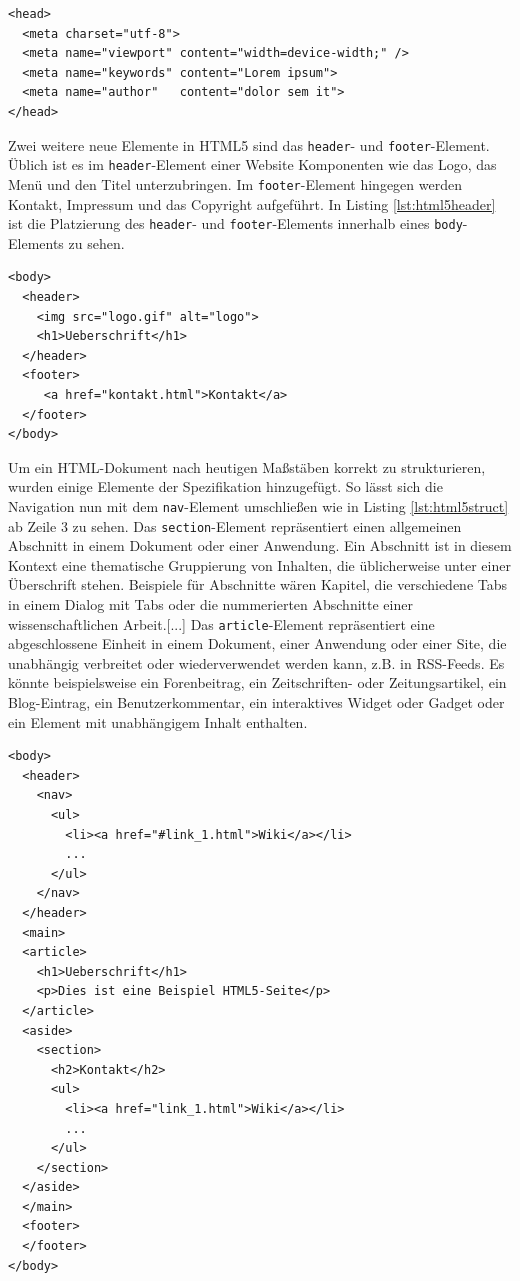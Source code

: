 \vspace{1em}
\begin{lstlisting}[language=HTML5, caption=HTML5 \texttt{meta}-Element, label=lst:html5meta]
<head>
  <meta charset="utf-8">
  <meta name="viewport" content="width=device-width;" />
  <meta name="keywords" content="Lorem ipsum">
  <meta name="author"   content="dolor sem it">
</head>
\end{lstlisting}
		
Zwei weitere neue Elemente in HTML5 sind das \texttt{header}- und \texttt{footer}-Element. Üblich ist es im \texttt{header}-Element einer Website Komponenten wie das Logo, das Menü und den Titel unterzubringen. Im \texttt{footer}-Element hingegen werden Kontakt, Impressum und das Copyright aufgeführt. In Listing \ref{lst:html5header} ist die Platzierung des \texttt{header}- und \texttt{footer}-Elements innerhalb eines \texttt{body}-Elements zu sehen.

\vspace{1em}
\begin{lstlisting}[language=HTML5, caption=HTML5 \texttt{header}- und \texttt{footer}-Element, label=lst:html5header]
<body>
  <header>
    <img src="logo.gif" alt="logo">
    <h1>Ueberschrift</h1>
  </header>
  <footer>
     <a href="kontakt.html">Kontakt</a>
  </footer>
</body>
\end{lstlisting}
	
Um ein HTML-Dokument nach heutigen Maßstäben korrekt zu strukturieren, wurden einige Elemente der Spezifikation hinzugefügt. So lässt sich die Navigation nun mit dem \texttt{nav}-Element umschließen wie in Listing \ref{lst:html5struct} ab Zeile 3 zu sehen. \glqq Das \texttt{section}-Element repräsentiert einen allgemeinen Abschnitt in einem Dokument oder einer Anwendung. Ein Abschnitt ist in diesem Kontext eine thematische Gruppierung von Inhalten, die üblicherweise unter einer Überschrift stehen. Beispiele für Abschnitte wären Kapitel, die verschiedene Tabs in einem Dialog mit Tabs oder die nummerierten Abschnitte einer wissenschaftlichen Arbeit.[...] Das \texttt{article}-Element repräsentiert eine abgeschlossene Einheit in einem Dokument, einer Anwendung oder einer Site, die unabhängig verbreitet oder wiederverwendet werden kann, z.B. in RSS-Feeds. Es könnte beispielsweise ein Forenbeitrag, ein Zeitschriften- oder Zeitungsartikel, ein Blog-Eintrag, ein Benutzerkommentar, ein interaktives Widget oder Gadget oder ein Element mit unabhängigem Inhalt enthalten.

\vspace{1em}
\begin{lstlisting}[language=HTML5, caption=HTML5 Struktur Elemente, label=lst:html5struct]
<body>
  <header>
    <nav>
      <ul>
        <li><a href="#link_1.html">Wiki</a></li>
        ...
      </ul>
    </nav>
  </header>
  <main>
  <article>
    <h1>Ueberschrift</h1>
    <p>Dies ist eine Beispiel HTML5-Seite</p>
  </article>
  <aside>
    <section>
      <h2>Kontakt</h2>
      <ul>
        <li><a href="link_1.html">Wiki</a></li>
        ...
      </ul>
    </section>
  </aside>
  </main>
  <footer>
  </footer>
</body>
\end{lstlisting}
	
